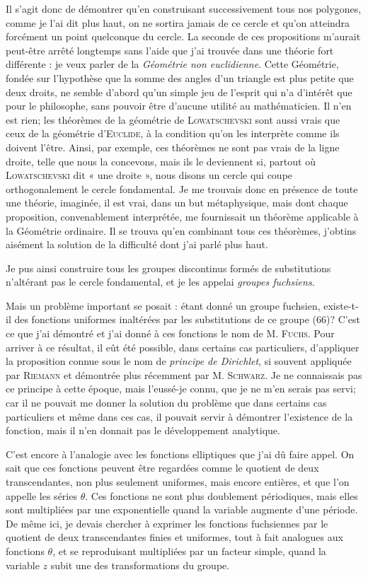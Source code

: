 \documentclass[11pt]{article}
\begin{document}
Il s’agit donc de démontrer qu’en construisant successivement tous nos polygones, comme je l’ai dit plus haut, on ne sortira jamais de ce cercle et qu’on atteindra forcément un point quelconque du cercle. La seconde de ces propositions m’aurait peut-être arrêté longtemps sans l’aide que j’ai trouvée dans une théorie fort différente : je veux parler de la \emph{Géométrie non euclidienne}. Cette Géométrie, fondée sur l’hypothèse que la somme des angles d’un triangle est plus petite que deux droits, ne semble d’abord qu’un simple jeu de l’esprit qui n’a d’intérêt que pour le philosophe, sans pouvoir être d’aucune utilité au mathématicien. Il n’en est rien; les théorèmes de la géométrie de \textsc{Lowatschevski} sont aussi vrais que ceux de la géométrie d’\textsc{Euclide}, à la condition qu’on les interprète comme ils doivent l’être. Ainsi, par exemple, ces théorèmes ne sont pas vrais de la ligne droite, telle que nous la concevons, mais ils le deviennent si, partout où \textsc{Lowatschevski} dit « une droite », nous disons un cercle qui coupe orthogonalement le cercle fondamental. Je me trouvais donc en présence de toute une théorie, imaginée, il est vrai, dans un but métaphysique, mais dont chaque proposition, convenablement interprétée, me fournissait un théorème applicable à la Géométrie ordinaire. Il se trouva qu’en combinant tous ces théorèmes, j’obtins aisément la solution de la difficulté dont j’ai parlé plus haut.

Je pus ainsi construire tous les groupes discontinus formés de substitutions n’altérant pas le cercle fondamental, et je les appelai \emph{groupes fuchsiens}.

Mais un problème important se posait : étant donné un groupe fuchsien, existe-t-il des fonctions uniformes inaltérées par les substitutions de ce groupe (66)? C’est ce que j’ai démontré et j’ai donné à ces fonctions le nom de M. \textsc{Fuchs}. Pour arriver à ce résultat, il eût été possible, dans certains cas particuliers, d’appliquer la proposition connue sous le nom de \emph{principe de Dirichlet}, si souvent appliquée par \textsc{Riemann} et démontrée plus récemment par M. \textsc{Schwarz}. Je ne connaissais pas ce principe à cette époque, mais l’eussé-je connu, que je ne m’en serais pas servi; car il ne pouvait me donner la solution du problème que dans certains cas particuliers et même dans ces cas, il pouvait servir à démontrer l’existence de la fonction, mais il n’en donnait pas le développement analytique.

C’est encore à l’analogie avec les fonctions elliptiques que j’ai dû faire appel. On sait que ces fonctions peuvent être regardées comme le quotient de deux transcendantes, non plus seulement uniformes, mais encore entières, et que l’on appelle les séries $\theta$. Ces fonctions ne sont plus doublement périodiques, mais elles sont multipliées par une exponentielle quand la variable augmente d’une période. De même ici, je devais chercher à exprimer les fonctions fuchsiennes par le quotient de deux transcendantes finies et uniformes, tout à fait analogues aux fonctions $\theta$, et se reproduisant multipliées par un facteur simple, quand la variable $z$ subit une des transformations du groupe.
\end{document}
